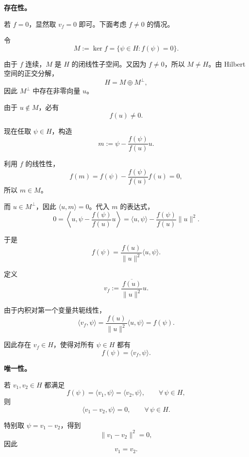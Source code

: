 \documentclass[UTF8,a4paper,11pt,openany]{ctexbook}
\begin{document}
\begin{proofblock}
\textbf{存在性。}

若 $f=0$，显然取 $v_f=0$ 即可。下面考虑 $f\neq0$ 的情况。

令
\begin{equation}
    M
    :=
    \ker f
    =
    \{\psi\in H:f(\psi)=0\}.
\end{equation}

由于 $f$ 连续，$M$ 是 $H$ 的闭线性子空间。又因为 $f\neq0$，所以 $M\neq H$。由 Hilbert 空间的正交分解，
\[
H=M\oplus M^\perp,
\]
因此 $M^\perp$ 中存在非零向量 $u$。

由于 $u\notin M$，必有
\[
f(u)\neq0.
\]

现在任取 $\psi\in H$，构造
\begin{equation}
    m
    :=
    \psi-\frac{f(\psi)}{f(u)}u.
\end{equation}

利用 $f$ 的线性性，
\[
f(m)
=
f(\psi)
-
\frac{f(\psi)}{f(u)}f(u)
=
0,
\]
所以 $m\in M$。

而 $u\in M^\perp$，因此 $\langle u,m\rangle=0$。代入 $m$ 的表达式，
\begin{equation}
    0
    =
    \left\langle
    u,
    \psi-\frac{f(\psi)}{f(u)}u
    \right\rangle
    =
    \langle u,\psi\rangle
    -
    \frac{f(\psi)}{f(u)}
    \|u\|^2.
\end{equation}

于是
\begin{equation}
    f(\psi)
    =
    \frac{f(u)}{\|u\|^2}
    \langle u,\psi\rangle.
\end{equation}

定义
\begin{equation}
    v_f
    :=
    \frac{\overline{f(u)}}{\|u\|^2}u.
\end{equation}

由于内积对第一个变量共轭线性，
\[
\langle v_f,\psi\rangle
=
\frac{f(u)}{\|u\|^2}
\langle u,\psi\rangle
=
f(\psi).
\]

因此存在 $v_f\in H$，使得对所有 $\psi\in H$ 都有
\[
f(\psi)
=
\langle v_f,\psi\rangle.
\]

\medskip

\textbf{唯一性。}

若 $v_1,v_2\in H$ 都满足
\[
f(\psi)
=
\langle v_1,\psi\rangle
=
\langle v_2,\psi\rangle,
\qquad
\forall\,\psi\in H,
\]
则
\[
\langle v_1-v_2,\psi\rangle
=
0,
\qquad
\forall\,\psi\in H.
\]

特别取 $\psi=v_1-v_2$，得到
\[
\|v_1-v_2\|^2=0,
\]
因此
\[
v_1=v_2.
\]


\end{proofblock}
\end{document}
